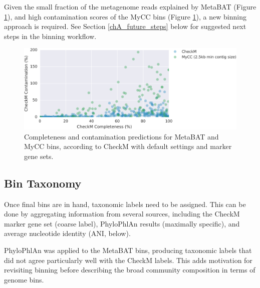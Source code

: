 Given the small fraction of the metagenome reads explained by MetaBAT (Figure \ref{fig:mycc_contamination}), and high contamination scores of the MyCC bins (Figure \ref{fig:mycc_contamination}), a new binning approach is required.
See Section \ref{chA_future_steps} below for suggested next steps in the binning workflow.


\begin{figure}[H]
\centering
    \includegraphics[width=1.0\textwidth]{./tex/chapter2/figures/170202_MyCC_has_higher_contamination--cleaned.pdf}
    \begin{singlespace}
    \caption[Completeness and contamination predictions for MetaBAT and MyCC bins]{ %
        Completeness and contamination predictions for MetaBAT and MyCC bins,
        according to CheckM with default settings and marker gene sets.
        }
    \label{fig:mycc_contamination}
    \end{singlespace}
\end{figure}

\subsection{Bin Taxonomy}

Once final bins are in hand, taxonomic labels need to be assigned.
This can be done by aggregating information from several sources, including the CheckM marker gene set (coarse label), PhyloPhlAn results (maximally specific), and average nucleotide identity (ANI, below).

PhyloPhlAn was applied to the MetaBAT bins, producing taxonomic labels that did not agree particularly well with the CheckM labels.
This adds motivation for revisiting binning before describing the broad community composition in terms of genome bins.


